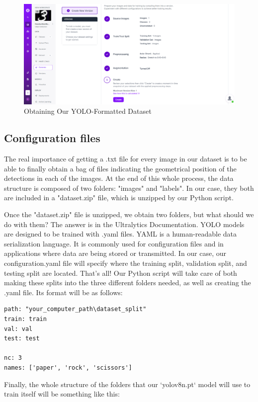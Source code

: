 \documentclass[../main]{subfiles}
\begin{document}
\begin{figure}[H]
     \centering
     \includegraphics[width=1\textwidth]{./figures/create}
     \caption{Obtaining Our YOLO-Formatted Dataset}
     \label{fig:red}
\end{figure}
\subsection{Configuration files}
The real importance of getting a .txt file for every image in our dataset is to be able to finally obtain a bag of files indicating the geometrical position of the detections in each of the images. At the end of this whole process, the data structure is composed of two folders: "images" and "labels". In our case, they both are included in a "dataset.zip" file, which is unzipped by our Python script.

Once the "dataset.zip" file is unzipped, we obtain two folders, but what should we do with them? The answer is in the Ultralytics Documentation. YOLO models are designed to be trained with .yaml files. YAML is a human-readable data serialization language. It is commonly used for configuration files and in applications where data are being stored or transmitted. In our case, our configuration.yaml file will specify where the training split, validation split, and testing split are located. That’s all! Our Python script will take care of both making these splits into the three different folders needed, as well as creating the .yaml file. Its format will be as follows:
\begin{lstlisting}
path: "your_computer_path\dataset_split"
train: train
val: val
test: test

nc: 3
names: ['paper', 'rock', 'scissors']
\end{lstlisting}

Finally, the whole structure of the folders that our `yolov8n.pt` model will use to train itself will be something like this:
\end{document}
